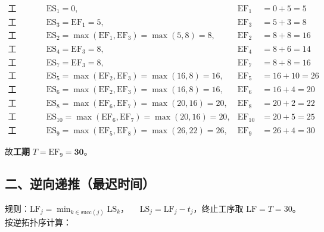 \documentclass[utf8]{ctexart}
\theoremstyle{mystyle}
\begin{document}
\begin{align*}
\text{工序~1（无前序）：}   &\quad \mathrm{ES}_1 = 0,                                                          &\mathrm{EF}_1 &= 0+5 = 5  \\
\text{工序~3（前序：1）：}   &\quad \mathrm{ES}_3 = \mathrm{EF}_1 = 5,                                         &\mathrm{EF}_3 &= 5+3 = 8  \\
\text{工序~2（前序：1,3）：} &\quad \mathrm{ES}_2 = \max(\mathrm{EF}_1,\mathrm{EF}_3)=\max(5,8)=8,             &\mathrm{EF}_2 &= 8+8 = 16 \\
\text{工序~4（前序：3）：}   &\quad \mathrm{ES}_4 = \mathrm{EF}_3 = 8,                                         &\mathrm{EF}_4 &= 8+6 = 14 \\
\text{工序~7（前序：3）：}   &\quad \mathrm{ES}_7 = \mathrm{EF}_3 = 8,                                         &\mathrm{EF}_7 &= 8+8 = 16 \\
\text{工序~5（前序：2,3）：} &\quad \mathrm{ES}_5 = \max(\mathrm{EF}_2,\mathrm{EF}_3)=\max(16,8)=16,           &\mathrm{EF}_5 &= 16+10=26 \\
\text{工序~6（前序：2,3）：} &\quad \mathrm{ES}_6 = \max(\mathrm{EF}_2,\mathrm{EF}_3)=\max(16,8)=16,           &\mathrm{EF}_6 &= 16+4 =20 \\
\text{工序~8（前序：6,7）：} &\quad \mathrm{ES}_8 = \max(\mathrm{EF}_6,\mathrm{EF}_7)=\max(20,16)=20,          &\mathrm{EF}_8 &= 20+2 =22 \\
\text{工序~10（前序：6,7）：}&\quad \mathrm{ES}_{10}=\max(\mathrm{EF}_6,\mathrm{EF}_7)=\max(20,16)=20,         &\mathrm{EF}_{10}&=20+5=25 \\
\text{工序~9（前序：5,8）：} &\quad \mathrm{ES}_9 = \max(\mathrm{EF}_5,\mathrm{EF}_8)=\max(26,22)=26,          &\mathrm{EF}_9 &= 26+4 =30
\end{align*}
 
\noindent
故\textbf{工期} $T = \mathrm{EF}_9 = \mathbf{30}$。
 
\subsection*{二、逆向递推（最迟时间）}
 
\noindent
规则：$\mathrm{LF}_j = \min_{k \in \mathrm{succ}(j)} \mathrm{LS}_k$，
$\quad\mathrm{LS}_j = \mathrm{LF}_j - t_j$，终止工序取 $\mathrm{LF}=T=30$。
按逆拓扑序计算：
 
\end{document}
